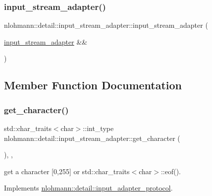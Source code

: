 \subsubsection{\texorpdfstring{input\_stream\_adapter()}{input\_stream\_adapter()}\hspace{0.1cm}{\footnotesize\ttfamily [3/3]}}
{\footnotesize\ttfamily nlohmann\+::detail\+::input\+\_\+stream\+\_\+adapter\+::input\+\_\+stream\+\_\+adapter (\begin{DoxyParamCaption}\item[{\mbox{\hyperlink{classnlohmann_1_1detail_1_1input__stream__adapter}{input\+\_\+stream\+\_\+adapter}} \&\&}]{ }\end{DoxyParamCaption})\hspace{0.3cm}{\ttfamily [delete]}}



\subsection{Member Function Documentation}
\mbox{\label{classnlohmann_1_1detail_1_1input__stream__adapter_ae0760af923583de6354725e901d1869d}} 
\subsubsection{\texorpdfstring{get\_character()}{get\_character()}}
{\footnotesize\ttfamily std\+::char\+\_\+traits$<$char$>$\+::int\+\_\+type nlohmann\+::detail\+::input\+\_\+stream\+\_\+adapter\+::get\+\_\+character (\begin{DoxyParamCaption}{ }\end{DoxyParamCaption})\hspace{0.3cm}{\ttfamily [inline]}, {\ttfamily [override]}, {\ttfamily [virtual]}}



get a character \mbox{[}0,255\mbox{]} or std\+::char\+\_\+traits$<$char$>$\+::eof(). 



Implements \mbox{\hyperlink{structnlohmann_1_1detail_1_1input__adapter__protocol_aac10a6a4048a8ce8e2ed50277692a3ca}{nlohmann\+::detail\+::input\+\_\+adapter\+\_\+protocol}}.



